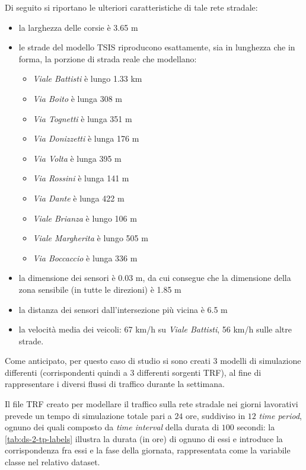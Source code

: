 Di seguito si riportano le ulteriori caratteristiche di tale rete stradale:
\begin{itemize}
	\item la larghezza delle corsie è \num{3.65} \si{\metre}
	\item le strade del modello \acs{TSIS} riproducono esattamente, sia in lunghezza che in forma, la porzione di strada reale che modellano:
	\begin{itemize}
		\item \emph{Viale Battisti} è lungo \num{1.33} \si{\kilo\metre}
		\item \emph{Via Boito} è lunga \num{308} \si{\metre}
		\item \emph{Via Tognetti} è lunga \num{351} \si{\metre}
		\item \emph{Via Donizzetti} è lunga \num{176} \si{\metre}
		\item \emph{Via Volta} è lunga \num{395} \si{\metre}
		\item \emph{Via Rossini} è lunga \num{141} \si{\metre}
		\item \emph{Via Dante} è lunga \num{422} \si{\metre}
		\item \emph{Viale Brianza} è lungo \num{106} \si{\metre}
		\item \emph{Viale Margherita} è lungo \num{505} \si{\metre}
		\item \emph{Via Boccaccio} è lunga \num{336} \si{\metre}
	\end{itemize}
	\item la dimensione dei sensori è \num{0.03} \si{\metre}, da cui consegue che la dimensione della zona sensibile (in tutte le direzioni) è \num{1.85} \si{\metre}
	\item la distanza dei sensori dall'intersezione più vicina è \num{6.5} \si{\metre}
	\item la velocità media dei veicoli: \num{67} \si{km/h} su \emph{Viale Battisti}, \num{56} \si{km/h} sulle altre strade.
\end{itemize}


Come anticipato, per questo caso di studio si sono creati $3$ modelli di simulazione differenti (corrispondenti quindi a $3$ differenti sorgenti \acs{TRF}), al fine di rappresentare i diversi flussi di traffico durante la settimana.

Il file \acs{TRF} creato per modellare il traffico sulla rete stradale nei giorni lavorativi prevede un tempo di simulazione totale pari a $24$ ore, suddiviso in $12$ \emph{time period}, ognuno dei quali composto da \emph{time interval} della durata di $100$ secondi: la \vref{tab:ds-2-tp-labels} illustra la durata (in ore) di ognuno di essi e introduce la corrispondenza fra essi e la fase della giornata, rappresentata come la variabile classe nel relativo dataset.

